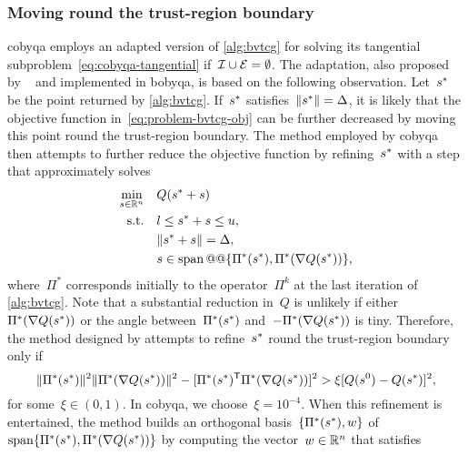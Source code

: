 \subsubsection{Moving round the trust-region boundary}

\Gls{cobyqa} employs an adapted version of \cref{alg:bvtcg} for solving its tangential subproblem~\cref{eq:cobyqa-tangential} if~$\mathcal{I} \cup \mathcal{E} = \emptyset$.
The adaptation, also proposed by \citeauthor{Powell_2009}~\cite[\S~3]{Powell_2009} and implemented in \gls{bobyqa}, is based on the following observation.
Let~$\sstep[\ast]$ be the point returned by \cref{alg:bvtcg}.
If~$\sstep[\ast]$ satisfies~$\norm{\sstep[\ast]} = \rad$, it is likely that the objective function in~\cref{eq:problem-bvtcg-obj} can be further decreased by moving this point round the trust-region boundary.
The method employed by \gls{cobyqa} then attempts to further reduce the objective function by refining~$\sstep[\ast]$ with a step that approximately solves
\begin{subequations}
    \label{eq:cobyqa-tangential-bounds-alternative}
    \begin{align}
        \min_{\sstep \in \R^n}  & \quad Q(\sstep[\ast] + \sstep)\\
        \text{s.t.}             & \quad \xl \le \sstep[\ast] + \sstep \le \xu,\\
                                & \quad \norm{\sstep[\ast] + \sstep} = \rad,\\
                                & \quad \sstep \in \vspan @@ \set{\Pi^{\ast}(\sstep[\ast]), \Pi^{\ast}(\nabla Q(\sstep[\ast]))},
    \end{align}
\end{subequations}
where~$\Pi^{\ast}$ corresponds initially to the operator~$\Pi^k$ at the last iteration of \cref{alg:bvtcg}.
Note that a substantial reduction in~$Q$ is unlikely if either~$\Pi^{\ast}(\nabla Q(\sstep[\ast]))$ or the angle between~$\Pi^{\ast}(\sstep[\ast])$ and~$-\Pi^{\ast}(\nabla Q(\sstep[\ast]))$ is tiny.
Therefore, the method designed by \citeauthor{Powell_2009} attempts to refine~$\sstep[\ast]$ round the trust-region boundary only if
\begin{equation*}
    \norm{\Pi^{\ast}(\sstep[\ast])}^2 \norm{\Pi^{\ast}(\nabla Q(\sstep[\ast]))}^2 - [\Pi^{\ast}(\sstep[\ast])^{\T} \Pi^{\ast}(\nabla Q(\sstep[\ast]))]^2 > \xi [Q(\sstep[0]) - Q(\sstep[\ast])]^2,
\end{equation*}
for some~$\xi \in (0, 1)$.
In \gls{cobyqa}, we choose~$\xi = 10^{-4}$.
When this refinement is entertained, the method builds an orthogonal basis~$\set{\Pi^{\ast}(\sstep[\ast]), w}$ of~$\vspan \set{\Pi^{\ast}(\sstep[\ast]), \Pi^{\ast}(\nabla Q(\sstep[\ast]))}$ by computing the vector~$w \in \mathbb{R}^n$ that satisfies
